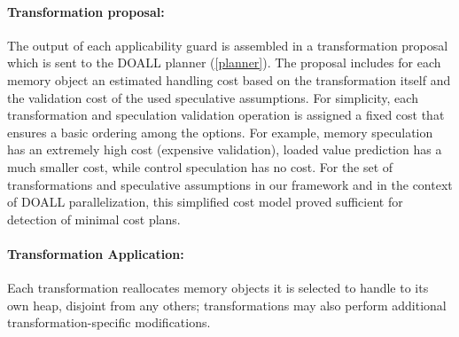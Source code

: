 \paragraph{Transformation proposal:} The output of each applicability
guard is assembled in a transformation proposal which is sent to the
DOALL planner (\cref{planner}).
%
The proposal includes for each memory object an estimated handling
cost based on the transformation itself and the validation cost of the
used speculative assumptions.
%
%
For simplicity, each transformation and speculation
validation operation is assigned a fixed
cost that ensures a basic ordering among the options. For
example,
memory speculation has an extremely high cost (expensive validation),
loaded value prediction has a much smaller cost, while
control speculation has no cost.
%
%
For the set of transformations and speculative assumptions in our
framework and in the context of DOALL parallelization, this simplified
cost model proved sufficient for detection of minimal cost plans.
%

%
%
%
%
%

\paragraph{Transformation Application:}
Each transformation reallocates
memory objects it is selected to handle
to its own heap, disjoint from any others; transformations may also
perform additional transformation-specific modifications.

